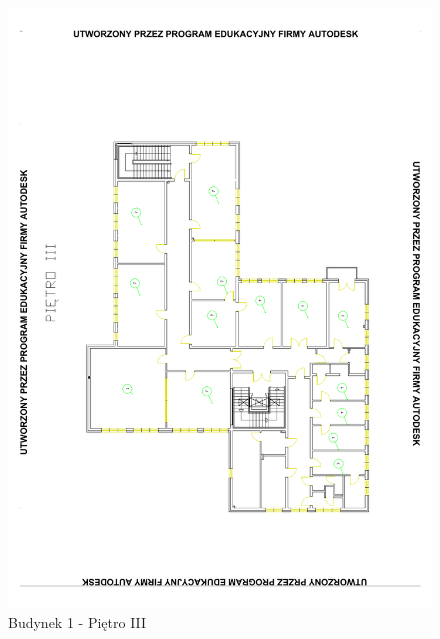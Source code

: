 \begin{figure}[H]
  \begin{center}
    \includegraphics[width=\textwidth]{img/b1-3.pdf}
    \caption{Budynek 1 - Piętro III}
  \end{center}
\end{figure}

